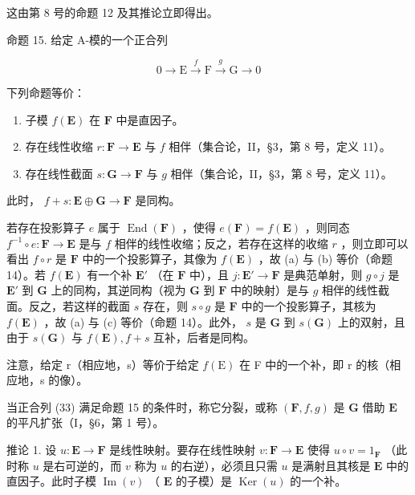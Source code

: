 这由第 8 号的命题 12 及其推论立即得出。

命题 15. 给定 A-模的一个正合列

\[
0 \longrightarrow \mathrm{E} \stackrel {f} {\longrightarrow} \mathrm{F} \stackrel {g} {\longrightarrow} \mathrm{G} \longrightarrow 0\tag{33}
\]

下列命题等价：

\begin{enumerate}
\def\labelenumi{(\alph{enumi})}
\item
  子模 \(f(\mathbf{E})\) 在 \(\mathbf{F}\) 中是直因子。
\item
  存在线性收缩 \(r: \mathbf{F} \to \mathbf{E}\) 与 \(f\) 相伴（集合论，II，§3，第 8 号，定义 11）。
\item
  存在线性截面 \(s: \mathbf{G} \to \mathbf{F}\) 与 \(g\) 相伴（集合论，II，§3，第 8 号，定义 11）。
\end{enumerate}

此时， \(f + s: \mathbf{E} \oplus \mathbf{G} \to \mathbf{F}\) 是同构。

若存在投影算子 \(e\) 属于 \(\operatorname{End}(\mathbf{F})\) ，使得 \(e(\mathbf{F}) = f(\mathbf{E})\) ，则同态 \(f^{-1} \circ e: \mathbf{F} \to \mathbf{E}\) 是与 \(f\) 相伴的线性收缩；反之，若存在这样的收缩 \(r\) ，则立即可以看出 \(f \circ r\) 是 \(\mathbf{F}\) 中的一个投影算子，其像为 \(f(\mathbf{E})\) ，故 (a) 与 (b) 等价（命题 14）。若 \(f(\mathbf{E})\) 有一个补 \(\mathbf{E}'\) （在 \(\mathbf{F}\) 中），且 \(j: \mathbf{E}' \to \mathbf{F}\) 是典范单射，则 \(g \circ j\) 是 \(\mathbf{E}'\) 到 \(\mathbf{G}\) 上的同构，其逆同构（视为 \(\mathbf{G}\) 到 \(\mathbf{F}\) 中的映射）是与 \(g\) 相伴的线性截面。反之，若这样的截面 \(s\) 存在，则 \(s \circ g\) 是 \(\mathbf{F}\) 中的一个投影算子，其核为 \(f(\mathbf{E})\) ，故 (a) 与 (c) 等价（命题 14）。此外， \(s\) 是 \(\mathbf{G}\) 到 \(s(\mathbf{G})\) 上的双射，且由于 \(s(\mathbf{G})\) 与 \(f(\mathbf{E}), f + s\) 互补，后者是同构。

注意，给定 r（相应地，s）等价于给定 \(f(\mathrm{E})\) 在 F 中的一个补，即 r 的核（相应地，s 的像）。

当正合列 (33) 满足命题 15 的条件时，称它分裂，或称 \((\mathbf{F}, f, g)\) 是 \(\mathbf{G}\) 借助 \(\mathbf{E}\) 的平凡扩张（I，§6，第 1 号）。

推论 1. 设 \(u: \mathbf{E} \to \mathbf{F}\) 是线性映射。要存在线性映射 \(v: \mathbf{F} \to \mathbf{E}\) 使得 \(u \circ v = 1_{\mathbf{F}}\) （此时称 \(u\) 是右可逆的，而 \(v\) 称为 \(u\) 的右逆），必须且只需 \(u\) 是满射且其核是 \(\mathbf{E}\) 中的直因子。此时子模 \(\operatorname{Im}(v)\) （ \(\mathbf{E}\) 的子模）是 \(\operatorname{Ker}(u)\) 的一个补。

